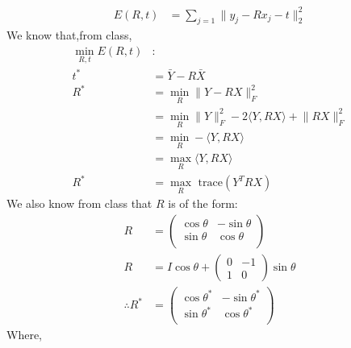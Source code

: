 \begin{align*}
E(R,t) &= \sum_{j=1}\lVert y_j - Rx_j - t \rVert_2^2
\end{align*}
We know that,from class,
\begin{align*}
\underset{R,t}{\operatorname{min}} E(R,t)&:\\
t^* &= \bar{Y} - R\bar{X} \\
R^* &= \underset{R}{\operatorname{min}}\lVert Y-RX \rVert_F^2\\
&=  \underset{R}{\operatorname{min}}\lVert Y \rVert_F^2 - 2\langle Y, RX \rangle + \lVert RX \rVert_F^2\\
&= \underset{R}{\operatorname{min}} -\langle Y,RX \rangle \\
&= \underset{R}{\operatorname{max}} \langle Y,RX \rangle \\
R^* &= \underset{R}{\operatorname{max}} \text{ trace}(Y^T RX) 
\end{align*}
We also know from class that $R$ is of the form:
\begin{align*}
R &=
\begin{pmatrix}
\cos\theta & -\sin\theta \\
\sin\theta & \cos\theta\\
\end{pmatrix}\\
R &= I\cos\theta + 
\begin{pmatrix}
0 & -1 \\ 1 & 0
\end{pmatrix}
\sin\theta \\
\therefore R^* &=
\begin{pmatrix}
\cos\theta^* & -\sin\theta^* \\
\sin\theta^* & \cos\theta^*\\
\end{pmatrix}
\end{align*}
Where, 
